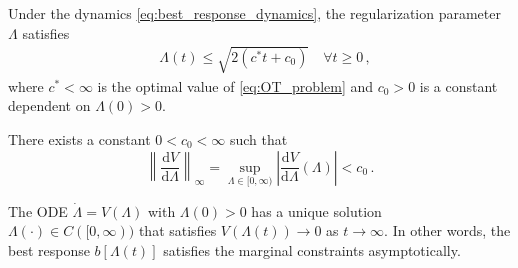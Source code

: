 \documentclass[10pt,a4paper]{amsart}
\renewcommand{\d}{\mathrm{d}}
\begin{document}
\begin{theorem}\label{thm:Lambda-upper}
    Under the dynamics \eqref{eq:best_response_dynamics}, the regularization parameter $\Lambda$ satisfies
    \begin{align*}
        &\Lambda(t) \le \sqrt{2(c^* t + c_0)} \quad \forall t\ge 0\,,
    \end{align*}
    where $c^*<\infty$ is the optimal value of \eqref{eq:OT_problem} and $c_0>0$ is a constant dependent on $\Lambda(0)>0$.
\end{theorem}

\begin{lemma}[Lipschitzness of $V$]\label{lem:V-Lip}
There exists a constant $0<c_0<\infty$ such that 
$$
\left\|\frac{\d V}{\d\Lambda}\right\|_\infty=\sup_{\Lambda\in[0,\infty)}\left|\frac{\d V}{\d\Lambda}(\Lambda)\right|<c_0\,.
$$
\end{lemma}

\begin{proposition}\label{prop:Lambda-properties}
    The ODE $\dot\Lambda=V(\Lambda)$ with $\Lambda(0)>0$ has a unique solution $\Lambda(\cdot)\in C([0,\infty))$ that satisfies $V(\Lambda(t))\to 0$ as $t\to\infty$. In other words, the best response $b[\Lambda(t)]$ satisfies the marginal constraints asymptotically.
\end{proposition}
\end{document}
